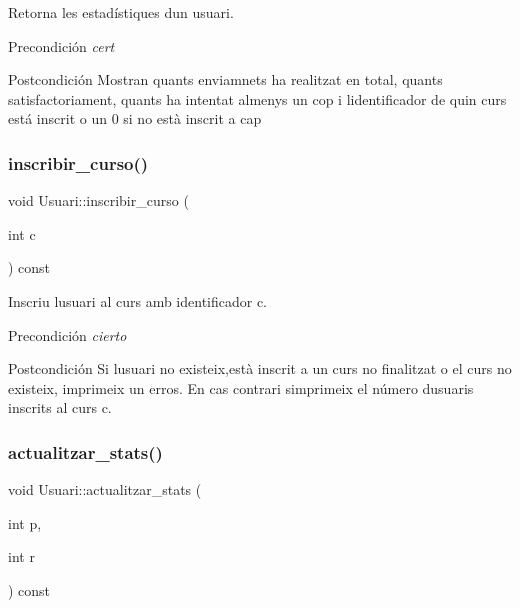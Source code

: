 Retorna les estadístiques d\textquotesingle{}un usuari. 

\begin{DoxyPrecond}{Precondición}
{\itshape cert} 
\end{DoxyPrecond}
\begin{DoxyPostcond}{Postcondición}
Mostran quants enviamnets ha realitzat en total, quants satisfactoriament, quants ha intentat almenys un cop i l\textquotesingle{}identificador de quin curs está inscrit o un 0 si no està inscrit a cap 
\end{DoxyPostcond}
\mbox{\label{class_usuari_aa67a0b994110236e30d9eac0ebf45fc7}} 
\subsubsection{\texorpdfstring{inscribir\+\_\+curso()}{inscribir\_curso()}}
{\footnotesize\ttfamily void Usuari\+::inscribir\+\_\+curso (\begin{DoxyParamCaption}\item[{int}]{c }\end{DoxyParamCaption}) const}



Inscriu l\textquotesingle{}usuari al curs amb identificador c. 

\begin{DoxyPrecond}{Precondición}
{\itshape cierto} 
\end{DoxyPrecond}
\begin{DoxyPostcond}{Postcondición}
Si l\textquotesingle{}usuari no existeix,està inscrit a un curs no finalitzat o el curs no existeix, imprimeix un erros. En cas contrari s\textquotesingle{}imprimeix el número d\textquotesingle{}usuaris inscrits al curs c. 
\end{DoxyPostcond}
\mbox{\label{class_usuari_a5721999c4381ccf24520dfcdda798587}} 
\subsubsection{\texorpdfstring{actualitzar\+\_\+stats()}{actualitzar\_stats()}}
{\footnotesize\ttfamily void Usuari\+::actualitzar\+\_\+stats (\begin{DoxyParamCaption}\item[{int}]{p,  }\item[{int}]{r }\end{DoxyParamCaption}) const}




